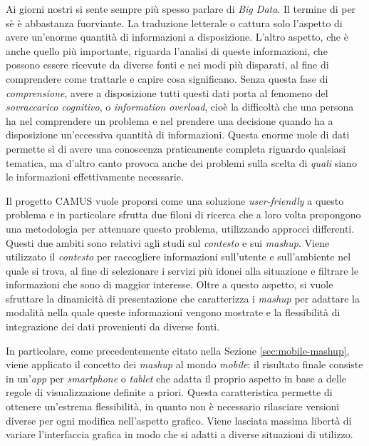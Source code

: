 Ai giorni nostri si sente sempre più spesso parlare di \emph{Big Data}. Il termine di per sè è abbastanza fuorviante. La traduzione letterale  o  cattura solo l'aspetto di avere un'enorme quantità di informazioni a disposizione. L'altro aspetto, che è anche quello più importante, riguarda l'analisi di queste informazioni, che possono essere ricevute da diverse fonti e nei modi più disparati, al fine di comprendere come trattarle e capire cosa significano. Senza questa fase di \emph{comprensione}, avere a disposizione tutti questi dati porta al fenomeno del \emph{sovraccarico cognitivo}, o \emph{information overload}, cioè la difficoltà che una persona ha nel comprendere un problema e nel prendere una decisione quando ha a disposizione un'eccessiva quantità di informazioni. Questa enorme mole di dati permette sì di avere una conoscenza praticamente completa riguardo qualsiasi tematica, ma d'altro canto provoca anche dei problemi sulla scelta di \emph{quali} siano le informazioni effettivamente necessarie. 
 
 Il progetto CAMUS vuole proporsi come una soluzione \emph{user-friendly} a questo problema e in particolare sfrutta due filoni di ricerca che a loro volta propongono una metodologia per attenuare questo problema, utilizzando approcci differenti. Questi due ambiti sono relativi agli studi sul \emph{contesto} e sui \emph{mashup}. Viene utilizzato il \emph{contesto} per raccogliere informazioni sull'utente e sull'ambiente nel quale si trova, al fine di selezionare i servizi più idonei alla situazione e filtrare le informazioni che sono di maggior interesse. Oltre a questo aspetto, si vuole sfruttare la dinamicità di presentazione che caratterizza i \emph{mashup} per adattare la modalità nella quale queste informazioni vengono mostrate e la flessibilità di integrazione dei dati provenienti da diverse fonti.

In particolare, come precedentemente citato nella Sezione \ref{sec:mobile-mashup}, viene applicato il concetto dei \emph{mashup} al mondo \emph{mobile}: il risultato finale consiste in un'\emph{app} per \emph{smartphone} o \emph{tablet} che adatta il proprio aspetto in base a delle regole di visualizzazione definite a priori. Questa caratteristica permette di ottenere un'estrema flessibilità, in quanto non è necessario rilasciare versioni diverse per ogni modifica nell'aspetto grafico. Viene lasciata massima libertà di variare l'interfaccia grafica in modo che si adatti a diverse situazioni di utilizzo.

